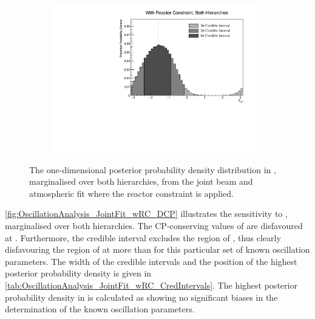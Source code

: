 \begin{figure}[h]
  \begin{subfigure}[t]{0.98\textwidth}
    \includegraphics[width=\textwidth, trim={0mm 0mm 0mm 0mm}, clip,page=1]{Figures/OA/JointFit_wRC/Contours_1D_dcp_BH_1_wRC_UnSmeared_CredibleInterval.pdf}
  \end{subfigure}
  \caption{The one-dimensional posterior probability density distribution in , marginalised over both hierarchies, from the joint beam and atmospheric fit where the reactor constraint is applied.}
  \label{fig:OscillationAnalysis_JointFit_wRC_DCP}
\end{figure}

\autoref{fig:OscillationAnalysis_JointFit_wRC_DCP} illustrates the sensitivity to , marginalised over both hierarchies. The CP-conserving values of  are disfavoured at \quickmath{2\sigma}. Furthermore, the \quickmath{3\sigma} credible interval excludes the region of , thus clearly disfavouring the region of  at more than \quickmath{3\sigma} for this particular set of known oscillation parameters. The width of the \quickmath{1\sigma} credible intervals and the position of the highest posterior probability density is given in \autoref{tab:OscillationAnalysis_JointFit_wRC_CredIntervals}. The highest posterior probability density in  is calculated as  showing no significant biases in the determination of the known oscillation parameters.

